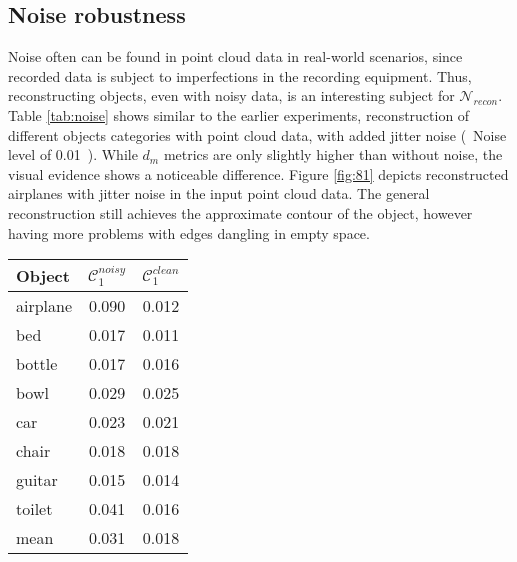 \subsection{Noise robustness}
    Noise often can be found in point cloud data in real-world scenarios, 
    since recorded data is subject to imperfections in the recording equipment.
    Thus, reconstructing objects, even with noisy data, is an interesting subject 
    for $\mathcal{N}_{recon}$. Table \ref{tab:noise} shows similar to the earlier 
    experiments, reconstruction of different objects categories with point cloud data,
    with added jitter noise (~Noise level of 0.01~).
    While $d_m$ metrics are only slightly higher than without noise, the visual evidence 
    shows a noticeable difference. Figure \ref{fig:81} depicts reconstructed airplanes with
    jitter noise in the input point cloud data. The general reconstruction still achieves 
    the approximate contour of the object, however having more problems with edges dangling 
    in empty space.
\begin{center}
     \label{tab:noise} 
    \begin{center}
        \begin{tabular}{| l  | c | c |}
            \hline
            Object& $\mathcal{C}_1^{noisy}$ & $\mathcal{C}_1^{clean}$ \\ \hline
            airplane&0.090&0.012\\\hline
            bed&0.017&0.011\\\hline
            bottle&0.017&0.016\\\hline
            bowl&0.029&0.025\\\hline
            car&0.023&0.021\\\hline
            chair&0.018&0.018\\\hline
            guitar&0.015&0.014\\\hline
            toilet&0.041&0.016\\\hline\hline
            mean&0.031&0.018\\\hline
        \end{tabular}
    \end{center}
\end{center}
